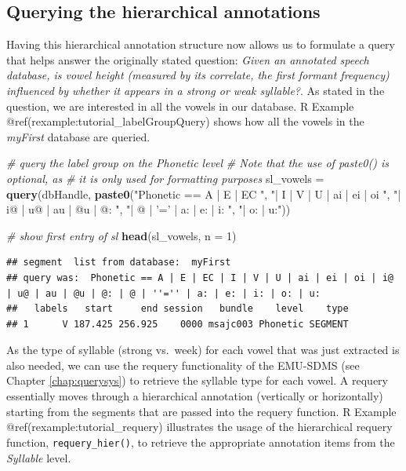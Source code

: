 \documentclass[]{book}
\newenvironment{Shaded}{\begin{snugshade}}{\end{snugshade}}
\newcommand{\KeywordTok}[1]{\textcolor[rgb]{0.13,0.29,0.53}{\textbf{{#1}}}}
\newcommand{\DataTypeTok}[1]{\textcolor[rgb]{0.13,0.29,0.53}{{#1}}}
\newcommand{\DecValTok}[1]{\textcolor[rgb]{0.00,0.00,0.81}{{#1}}}
\newcommand{\StringTok}[1]{\textcolor[rgb]{0.31,0.60,0.02}{{#1}}}
\newcommand{\CommentTok}[1]{\textcolor[rgb]{0.56,0.35,0.01}{\textit{{#1}}}}
\newcommand{\NormalTok}[1]{{#1}}
\theoremstyle{definition}
\theoremstyle{definition}
\theoremstyle{definition}
\theoremstyle{remark}
\begin{document}
\subsection{Querying the hierarchical
annotations}\label{querying-the-hierarchical-annotations}

Having this hierarchical annotation structure now allows us to formulate
a query that helps answer the originally stated question: \emph{Given an
annotated speech database, is vowel height (measured by its correlate,
the first formant frequency) influenced by whether it appears in a
strong or weak syllable?}. As stated in the question, we are interested
in all the vowels in our database. R Example
@ref(rexample:tutorial\_labelGroupQuery) shows how all the vowels in the
\emph{myFirst} database are queried.

\begin{Shaded}
\begin{Highlighting}[]
\CommentTok{# query the label group on the Phonetic level}
\CommentTok{# Note that the use of paste0() is optional, as}
\CommentTok{# it is only used for formatting purposes}
\NormalTok{sl_vowels =}\StringTok{ }\KeywordTok{query}\NormalTok{(dbHandle, }\KeywordTok{paste0}\NormalTok{(}\StringTok{"Phonetic == A | E | EC "}\NormalTok{,}
                                   \StringTok{"| I | V | U | ai | ei | oi "}\NormalTok{,}
                                   \StringTok{"| i@ | u@ | au | @u | @: "}\NormalTok{,}
                                   \StringTok{"| @ | '=' | a: | e: | i: "}\NormalTok{,}
                                   \StringTok{"| o: | u:"}\NormalTok{))}

\CommentTok{# show first entry of sl}
\KeywordTok{head}\NormalTok{(sl_vowels, }\DataTypeTok{n =} \DecValTok{1}\NormalTok{)}
\end{Highlighting}
\end{Shaded}

\begin{verbatim}
## segment  list from database:  myFirst 
## query was:  Phonetic == A | E | EC | I | V | U | ai | ei | oi | i@ | u@ | au | @u | @: | @ | ''='' | a: | e: | i: | o: | u: 
##   labels   start     end session   bundle    level    type
## 1      V 187.425 256.925    0000 msajc003 Phonetic SEGMENT
\end{verbatim}

As the type of syllable (strong vs.~week) for each vowel that was just
extracted is also needed, we can use the requery functionality of the
EMU-SDMS (see Chapter \ref{chap:querysys}) to retrieve the syllable type
for each vowel. A requery essentially moves through a hierarchical
annotation (vertically or horizontally) starting from the segments that
are passed into the requery function. R Example
@ref(rexample:tutorial\_requery) illustrates the usage of the
hierarchical requery function, \texttt{requery\_hier()}, to retrieve the
appropriate annotation items from the \emph{Syllable} level.
\end{document}
